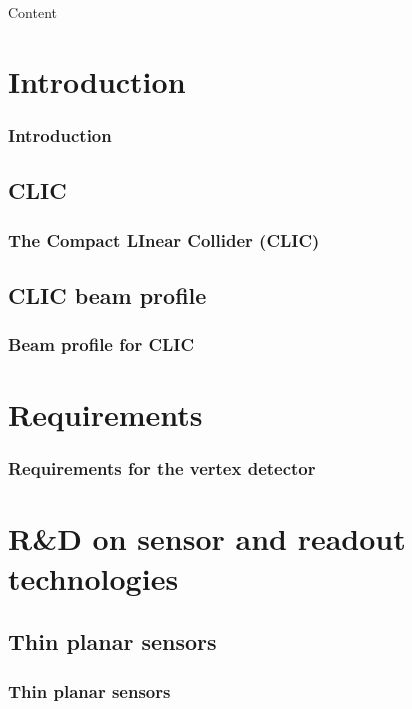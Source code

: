 
\begin{frame}{Content}{}
\tableofcontents
\end{frame}

\section{Introduction}
\begin{frame}
  \frametitle{Introduction}

\end{frame}

\subsection{CLIC}
\begin{frame}
  \frametitle{The Compact LInear Collider (CLIC)}
\end{frame}

\subsection{CLIC beam profile}
\begin{frame}
  \frametitle{Beam profile for CLIC}
\end{frame}

\section{Requirements}
\begin{frame}
  \frametitle{Requirements for the vertex detector}
\end{frame}


\section{R\&D on sensor and readout technologies}
\subsection{Thin planar sensors}
\begin{frame}
  \frametitle{Thin planar sensors}
\end{frame}
